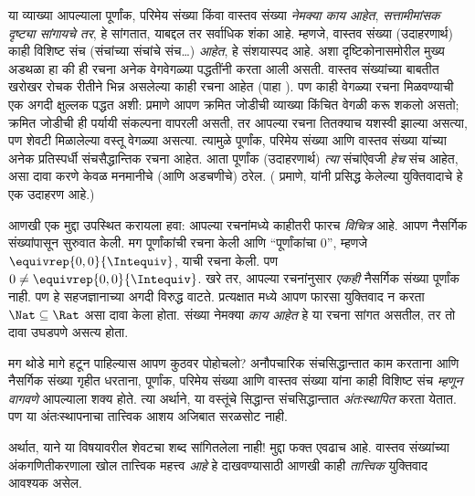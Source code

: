 \documentclass[../../../include/open-logic-section]{subfiles}
\begin{document}
या व्याख्या आपल्याला पूर्णांक, परिमेय संख्या किंवा वास्तव संख्या
\emph{नेमक्या काय आहेत}, \emph{सत्तामीमांसक दृष्ट्या सांगायचे तर}, हे
सांगतात, याबद्दल तर
सर्वाधिक शंका आहे. म्हणजे, वास्तव संख्या (उदाहरणार्थ) काही विशिष्ट संच
(संचांच्या संचांचे संच\ldots) \emph{आहेत}, हे संशयास्पद आहे. अशा
दृष्टिकोनासमोरील मुख्य अडथळा हा की ही रचना अनेक वेगवेगळ्या पद्धतींनी करता
आली असती. वास्तव संख्यांच्या बाबतीत खरोखर रोचक रीतीने भिन्न असलेल्या काही
रचना आहेत (पाहा ). पण काही वेगळ्या रचना मिळवण्याची
एक अगदी क्षुल्लक पद्धत अशी:  प्रमाणे आपण
क्रमित जोडीची व्याख्या किंचित वेगळी करू शकलो असतो; क्रमित जोडीची ही
पर्यायी संकल्पना वापरली असती, तर आपल्या रचना तितक्याच यशस्वी झाल्या
असत्या, पण शेवटी मिळालेल्या वस्तू वेगळ्या असत्या. त्यामुळे पूर्णांक,
परिमेय संख्या आणि वास्तव संख्या यांच्या अनेक प्रतिस्पर्धी संचसैद्धान्तिक
रचना आहेत. आता पूर्णांक (उदाहरणार्थ) \emph{त्या} संचांऐवजी \emph{हेच}
संच आहेत, असा दावा करणे केवळ मनमानीचे (आणि अडचणीचे) ठरेल.
( प्रमाणे, \citealt{Benacerraf1965} यांनी
प्रसिद्ध केलेल्या युक्तिवादाचे हे एक उदाहरण आहे.)

आणखी एक मुद्दा उपस्थित करायला हवा: आपल्या रचनांमध्ये काहीतरी फारच
\emph{विचित्र} आहे. आपण नैसर्गिक संख्यांपासून सुरुवात केली. मग पूर्णांकांची
रचना केली आणि ``पूर्णांकांचा $0$'', म्हणजे $ \equivrep{0,0}{\Intequiv}$,
याची रचना केली. पण $0 \neq \equivrep{0,0}{\Intequiv}$. खरे तर, आपल्या
रचनांनुसार \emph{एकही} नैसर्गिक संख्या पूर्णांक नाही. पण हे सहजज्ञानाच्या
अगदी विरुद्ध वाटते. प्रत्यक्षात  मध्ये आपण
फारसा युक्तिवाद न करता $\Nat \subseteq \Rat$ असा दावा केला होता. संख्या
नेमक्या \emph{काय आहेत} हे या रचना सांगत असतील, तर तो दावा उघडपणे असत्य
होता.

मग थोडे मागे हटून पाहिल्यास आपण कुठवर पोहोचलो? अनौपचारिक संचसिद्धान्तात
काम करताना आणि नैसर्गिक संख्या गृहीत धरताना, पूर्णांक, परिमेय संख्या आणि
वास्तव संख्या यांना काही विशिष्ट संच \emph{म्हणून वागवणे} आपल्याला शक्य
होते. त्या अर्थाने, या वस्तूंचे सिद्धान्त संचसिद्धान्तात
\emph{अंतःस्थापित} करता येतात. पण या अंतःस्थापनाचा तात्त्विक आशय अजिबात
सरळसोट नाही.

अर्थात, याने या विषयावरील शेवटचा शब्द सांगितलेला नाही!{} मुद्दा फक्त
एवढाच आहे. वास्तव संख्यांच्या अंकगणितीकरणाला खोल तात्त्विक महत्त्व
\emph{आहे} हे दाखवण्यासाठी आणखी काही \emph{तात्त्विक} युक्तिवाद आवश्यक असेल.

\end{document}
